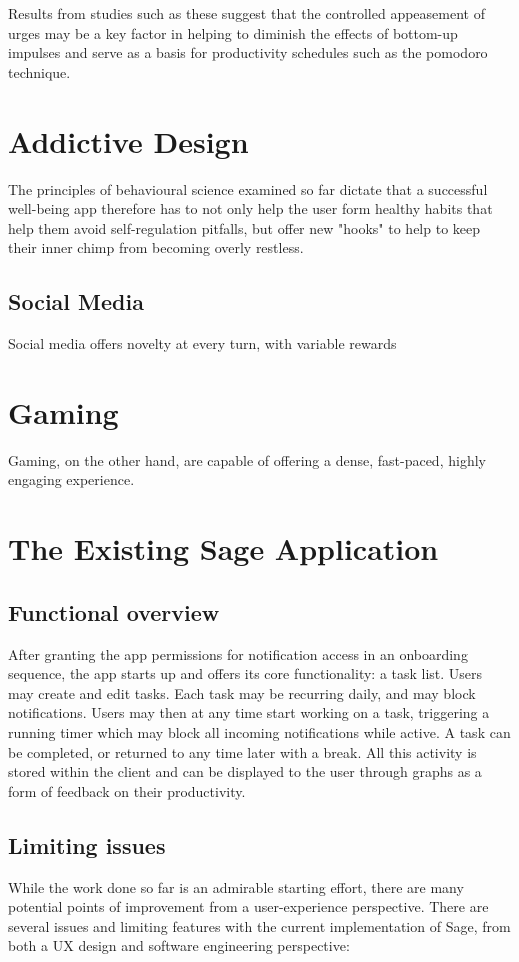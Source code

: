 Results from studies such as these suggest that the controlled appeasement of urges may be a key factor in helping to diminish the effects of bottom-up impulses and serve as a basis for productivity schedules such as the pomodoro technique. 

\section{Addictive Design}
The principles of behavioural science examined so far dictate that a successful well-being app therefore has to not only help the user form healthy habits that help them avoid self-regulation pitfalls, but offer new "hooks" to help to keep their inner chimp from becoming overly restless.

\subsection{Social Media}
Social media offers novelty at every turn, with variable rewards

\section{Gaming}
Gaming, on the other hand, are capable of offering a dense, fast-paced, highly engaging experience.


\section{The Existing Sage Application}
\subsection{Functional overview}
After granting the app permissions for notification access in an onboarding sequence, the app starts up and offers its core functionality: a task list. Users may create and edit tasks. Each task may be recurring daily, and may block notifications. Users may then at any time start working on a task, triggering a running timer which may block all incoming notifications while active. A task can be completed, or returned to any time later with a break. All this activity is stored within the client and can be displayed to the user through graphs as a form of feedback on their productivity.


\subsection{Limiting issues}
While the work done so far is an admirable starting effort, there are many potential points of improvement from a user-experience perspective. There are several issues and limiting features with the current implementation of Sage, from both a UX design and software engineering perspective:

